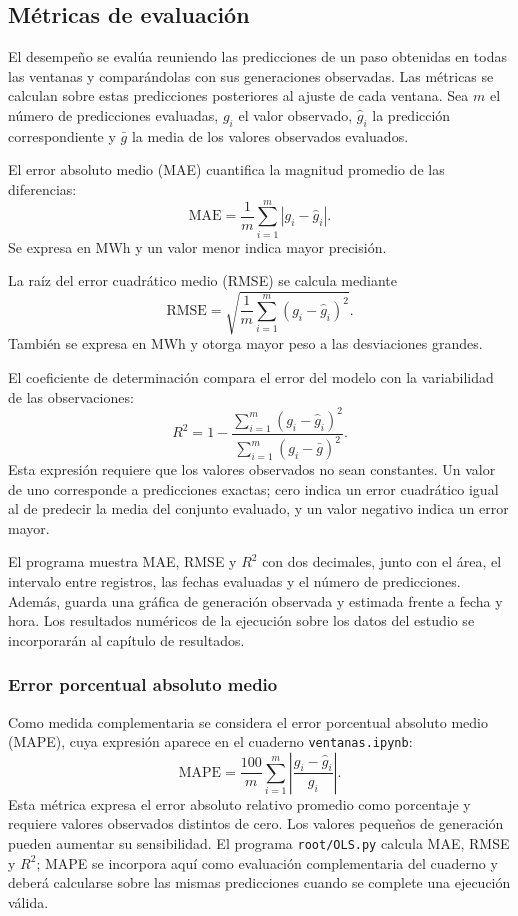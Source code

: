 \subsection{Métricas de evaluación}

El desempeño se evalúa reuniendo las predicciones de un paso obtenidas en todas las ventanas y comparándolas con sus generaciones observadas. Las métricas se calculan sobre estas predicciones posteriores al ajuste de cada ventana. Sea $m$ el número de predicciones evaluadas, $g_i$ el valor observado, $\hat g_i$ la predicción correspondiente y $\bar g$ la media de los valores observados evaluados.

El error absoluto medio (MAE) cuantifica la magnitud promedio de las diferencias:
\begin{equation}
\mathrm{MAE}=\frac{1}{m}\sum_{i=1}^{m}|g_i-\hat g_i|.
\end{equation}
Se expresa en MWh y un valor menor indica mayor precisión.

La raíz del error cuadrático medio (RMSE) se calcula mediante
\begin{equation}
\mathrm{RMSE}=\sqrt{\frac{1}{m}\sum_{i=1}^{m}(g_i-\hat g_i)^2}.
\end{equation}
También se expresa en MWh y otorga mayor peso a las desviaciones grandes.

El coeficiente de determinación compara el error del modelo con la variabilidad de las observaciones:
\begin{equation}
R^2=1-\frac{\sum_{i=1}^{m}(g_i-\hat g_i)^2}
{\sum_{i=1}^{m}(g_i-\bar g)^2}.
\end{equation}
Esta expresión requiere que los valores observados no sean constantes. Un valor de uno corresponde a predicciones exactas; cero indica un error cuadrático igual al de predecir la media del conjunto evaluado, y un valor negativo indica un error mayor.

El programa muestra MAE, RMSE y $R^2$ con dos decimales, junto con el área, el intervalo entre registros, las fechas evaluadas y el número de predicciones. Además, guarda una gráfica de generación observada y estimada frente a fecha y hora. Los resultados numéricos de la ejecución sobre los datos del estudio se incorporarán al capítulo de resultados.

\subsubsection{Error porcentual absoluto medio}

Como medida complementaria se considera el error porcentual absoluto medio (MAPE), cuya expresión aparece en el cuaderno \texttt{ventanas.ipynb}:
\begin{equation}
\mathrm{MAPE}=\frac{100}{m}\sum_{i=1}^{m}
\left|\frac{g_i-\hat g_i}{g_i}\right|.
\end{equation}
Esta métrica expresa el error absoluto relativo promedio como porcentaje y requiere valores observados distintos de cero. Los valores pequeños de generación pueden aumentar su sensibilidad. El programa \texttt{root/OLS.py} calcula MAE, RMSE y $R^2$; MAPE se incorpora aquí como evaluación complementaria del cuaderno y deberá calcularse sobre las mismas predicciones cuando se complete una ejecución válida.

